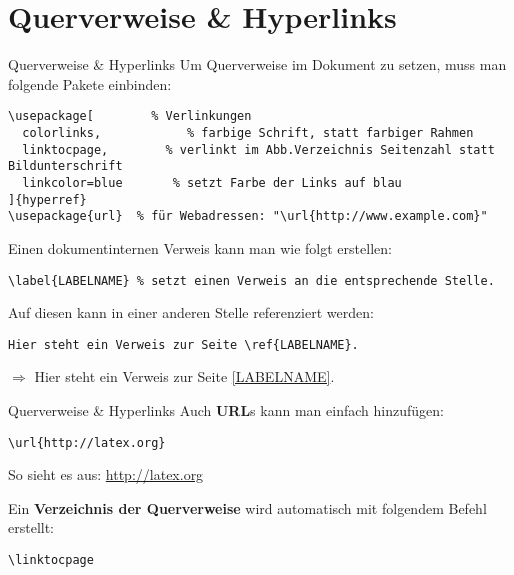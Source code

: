 \section{Querverweise \& Hyperlinks}
\begin{frame}[fragile]{Querverweise \& Hyperlinks}
Um Querverweise im Dokument zu setzen, muss man folgende Pakete einbinden:
\begin{lstlisting}[style=tex]
\usepackage[        % Verlinkungen
  colorlinks,            % farbige Schrift, statt farbiger Rahmen
  linktocpage,        % verlinkt im Abb.Verzeichnis Seitenzahl statt Bildunterschrift
  linkcolor=blue       % setzt Farbe der Links auf blau
]{hyperref}
\usepackage{url}  % für Webadressen: "\url{http://www.example.com}"
\end{lstlisting}\pause

\bigskip
Einen dokumentinternen Verweis\label{LABELNAME} kann man wie folgt erstellen:
\begin{lstlisting}[style=tex]
\label{LABELNAME} % setzt einen Verweis an die entsprechende Stelle.
\end{lstlisting}

Auf diesen kann in einer anderen Stelle referenziert werden:
\begin{lstlisting}[style=tex]
Hier steht ein Verweis zur Seite \ref{LABELNAME}.
\end{lstlisting}\pause

\bigskip
$\Rightarrow$ Hier steht ein Verweis zur Seite \ref{LABELNAME}.
\end{frame}

\begin{frame}[fragile]{Querverweise \& Hyperlinks}
Auch \textbf{URL}s kann man einfach hinzufügen:
\begin{lstlisting}[style=tex]
\url{http://latex.org}
\end{lstlisting}
So sieht es aus: \url{http://latex.org}\pause

\bigskip
Ein \textbf{Verzeichnis der Querverweise} wird automatisch mit folgendem Befehl erstellt:
\begin{lstlisting}[style=tex]
\linktocpage
\end{lstlisting}
\end{frame}
